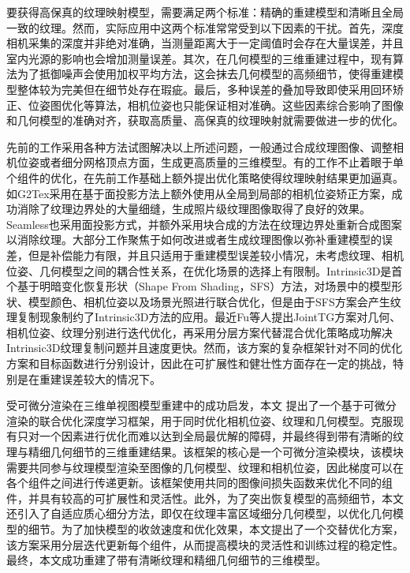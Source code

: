 要获得高保真的纹理映射模型，需要满足两个标准：精确的重建模型和清晰且全局一致的纹理。然而，实际应用中这两个标准常常受到以下因素的干扰。首先，深度相机采集的深度并非绝对准确，当测量距离大于一定阈值时会存在大量误差，并且室内光源的影响也会增加测量误差。其次，在几何模型的三维重建过程中，现有算法为了抵御噪声会使用加权平均方法，这会抹去几何模型的高频细节，使得重建模型整体较为完美但在细节处存在瑕疵。最后，多种误差的叠加导致即使采用回环矫正、位姿图优化等算法，相机位姿也只能保证相对准确。这些因素综合影响了图像和几何模型的准确对齐，获取高质量、高保真的纹理映射就需要做进一步的优化。\par


先前的工作采用各种方法试图解决以上所述问题，一般通过合成纹理图像、调整相机位姿或者细分网格顶点方面，生成更高质量的三维模型。有的工作不止着眼于单个组件的优化，在先前工作基础上额外提出优化策略使得纹理映射结果更加逼真。如G2Tex采用在基于面投影方法上额外使用从全局到局部的相机位姿矫正方案，成功消除了纹理边界处的大量细缝，生成照片级纹理图像取得了良好的效果。Seamless也采用面投影方式，并额外采用块合成的方法在纹理边界处重新合成图案以消除纹理。大部分工作聚焦于如何改进或者生成纹理图像以弥补重建模型的误差，但是补偿能力有限，并且只适用于重建模型误差较小情况，未考虑纹理、相机位姿、几何模型之间的耦合性关系，在优化场景的选择上有限制。Intrinsic3D是首个基于明暗变化恢复形状（Shape From Shading，SFS）方法，对场景中的模型形状、模型颜色、相机位姿以及场景光照进行联合优化，但是由于SFS方案会产生纹理复制现象制约了Intrinsic3D方法的应用。最近Fu等人提出JointTG方案对几何、相机位姿、纹理分别进行迭代优化，再采用分层方案代替混合优化策略成功解决Intrinsic3D纹理复制问题并且速度更快。然而，该方案的复杂框架针对不同的优化方案和目标函数进行分别设计，因此在可扩展性和健壮性方面存在一定的挑战，特别是在重建误差较大的情况下。\par


受可微分渲染在三维单视图模型重建中的成功启发，本文
提出了一个基于可微分渲染的联合优化深度学习框架，用于同时优化相机位姿、纹理和几何模型。克服现有只对一个因素进行优化而难以达到全局最优解的障碍，并最终得到带有清晰的纹理与精细几何细节的三维重建结果。该框架的核心是一个可微分渲染模块，该模块需要共同参与纹理模型渲染至图像的几何模型、纹理和相机位姿，因此梯度可以在各个组件之间进行传递更新。该框架使用共同的图像间损失函数来优化不同的组件，并具有较高的可扩展性和灵活性。此外，为了突出恢复模型的高频细节，本文还引入了自适应质心细分方法，即仅在纹理丰富区域细分几何模型，以优化几何模型的细节。为了加快模型的收敛速度和优化效果，本文提出了一个交替优化方案，该方案采用分层迭代更新每个组件，从而提高模块的灵活性和训练过程的稳定性。最终，本文成功重建了带有清晰纹理和精细几何细节的三维模型。\par


